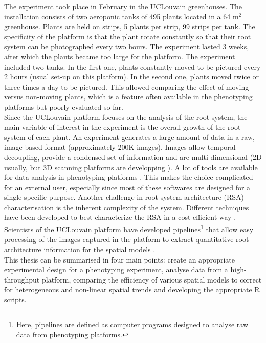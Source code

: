The experiment took place in February in the UCLouvain greenhouses. The installation consists of two aeroponic tanks of 495 plants located in a 64 m$^2$ greenhouse. Plants are held on strips, 5 plants per strip, 99 strips per tank. The specificity of 
the platform is that the plant rotate constantly so that their root system can be photographed every two hours.
The experiment lasted 3 weeks, after which the plants became too large for the platform. The experiment included two tanks. In the first one, plants constantly moved to be pictured every 2 hours (usual set-up on this platform). In the second one, plants  moved twice or three times a day to be pictured. This allowed comparing the effect of moving versus non-moving plants, which is a feature often available in the phenotyping platforms but poorly evaluated so far.\\

Since the UCLouvain platform focuses on the analysis of the root system, the main variable of interest in the experiment is the overall growth of the root system of each plant. 
An experiment generates a large amount of data in a raw, image-based format (approximately 200K images). 
Images allow temporal decoupling, provide a condensed set of information and are multi-dimensional (2D usually, but 3D scanning platforms are developping \parencite{mooney_developing_2012}). 
A lot of tools are available for data analysis in phenotyping platforms \parencite{lobet_online_2013}. This makes the choice complicated for an external user, especially since most of these softwares are designed for a single specific purpose. Another challenge in root system architecture (RSA) characterisation is the inherent complexity of the system. Different techniques have been developed to best characterize the RSA in a cost-efficient way \parencite{pound_rootnav:_2013,lobet_novel_2013}. 
Scientists of the UCLouvain platform have developed pipelines\footnote{Here, pipelines are defined as computer programs designed to analyse raw data from phenotyping platforms.} that allow easy processing of the images captured in the platform to extract quantitative root architecture information for the spatial models \parencite{lobet_novel_2013,lobet_novel_2011}.\\

This thesis can be summarised in four main points: create an appropriate experimental design for a phenotyping experiment, analyse data from a high-throughput platform, comparing the efficiency of various spatial models to correct for heterogeneous and non-linear spatial trends and developing the appropriate R scripts.